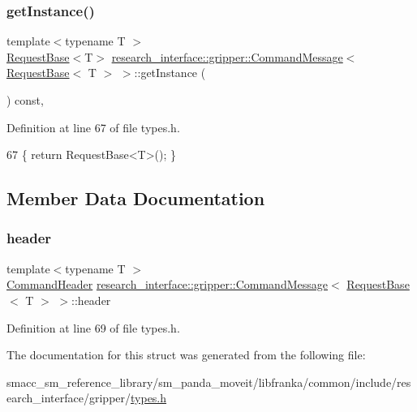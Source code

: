 \subsubsection{\texorpdfstring{get\+Instance()}{getInstance()}}
{\footnotesize\ttfamily template$<$typename T $>$ \\
\hyperlink{structresearch__interface_1_1gripper_1_1RequestBase}{Request\+Base}$<$T$>$ \hyperlink{structresearch__interface_1_1gripper_1_1CommandMessage}{research\+\_\+interface\+::gripper\+::\+Command\+Message}$<$ \hyperlink{structresearch__interface_1_1gripper_1_1RequestBase}{Request\+Base}$<$ T $>$ $>$\+::get\+Instance (\begin{DoxyParamCaption}{ }\end{DoxyParamCaption}) const\hspace{0.3cm}{\ttfamily [inline]}, {\ttfamily [noexcept]}}



Definition at line 67 of file types.\+h.


\begin{DoxyCode}
67 \{ \textcolor{keywordflow}{return} RequestBase<T>(); \}
\end{DoxyCode}


\subsection{Member Data Documentation}
\mbox{\label{structresearch__interface_1_1gripper_1_1CommandMessage_3_01RequestBase_3_01T_01_4_01_4_a3ac3bc01bbe1e063fb3f8dae485f18e2}} 
\subsubsection{\texorpdfstring{header}{header}}
{\footnotesize\ttfamily template$<$typename T $>$ \\
\hyperlink{structresearch__interface_1_1gripper_1_1CommandHeader}{Command\+Header} \hyperlink{structresearch__interface_1_1gripper_1_1CommandMessage}{research\+\_\+interface\+::gripper\+::\+Command\+Message}$<$ \hyperlink{structresearch__interface_1_1gripper_1_1RequestBase}{Request\+Base}$<$ T $>$ $>$\+::header}



Definition at line 69 of file types.\+h.



The documentation for this struct was generated from the following file\+:\begin{DoxyCompactItemize}
\item 
smacc\+\_\+sm\+\_\+reference\+\_\+library/sm\+\_\+panda\+\_\+moveit/libfranka/common/include/research\+\_\+interface/gripper/\hyperlink{types_8h}{types.\+h}\end{DoxyCompactItemize}
